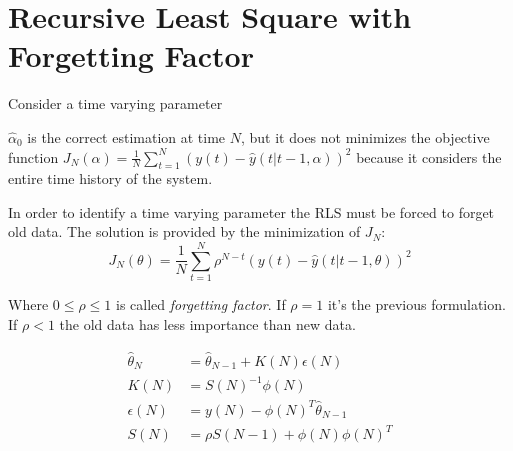 \section{Recursive Least Square with Forgetting Factor}

Consider a time varying parameter
\begin{figure}[H]
    \centering
    \begin{minipage}[t]{0.48\textwidth}
        \centering
    \end{minipage}
    \begin{minipage}[t]{0.48\textwidth}
        \centering
    \end{minipage}
\end{figure}

$\hat{\alpha}_0$ is the correct estimation at time $N$, but it does not minimizes the objective function $J_N(\alpha)= \frac{1}{N} \sum_{t=1}^N \left( y(t) - \hat{y}(t|t-1, \alpha) \right)^2$ because it considers the entire time history of the system.

In order to identify a time varying parameter the RLS must be forced to forget old data.
The solution is provided by the minimization of $J_N$:
\[
    J_N(\theta) = \frac{1}{N} \sum_{t=1}^N \rho^{N-t}\left( y(t) - \hat{y}(t|t-1,\theta) \right)^2
\]

Where $0 \le \rho \le 1$ is called \emph{forgetting factor}. If $\rho=1$ it's the previous formulation. If $\rho<1$ the old data has less importance than new data.

\begin{align*}
    \hat{\theta}_N &= \hat{\theta}_{N-1} + K(N)\epsilon(N) \\
    K(N) &= S(N)^{-1}\phi(N) \\
    \epsilon(N) &= y(N) - \phi(N)^T\hat{\theta}_{N-1} \\
    S(N) &= \rho S(N-1) + \phi(N)\phi(N)^T
\end{align*}

